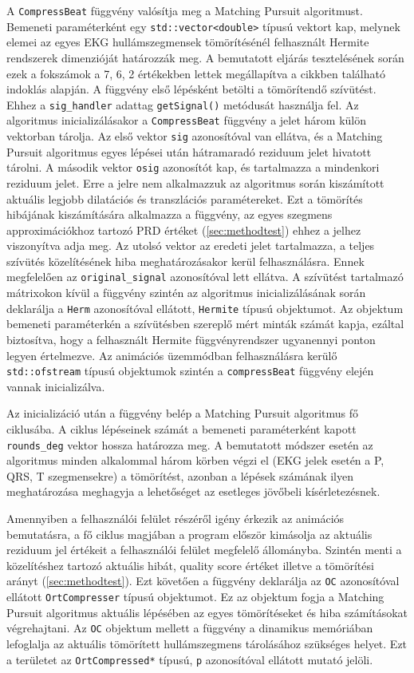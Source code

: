 \documentclass[oneside,titlepage,12pt,a4paper]{report}
\begin{document}
A \texttt{CompressBeat} függvény valósítja meg a Matching Pursuit algoritmust. Bemeneti paraméterként egy \texttt{std::vector<double>}
típusú vektort kap, melynek elemei az egyes EKG hullámszegmensek tömörítésénél felhasznált Hermite rendszerek dimenzióját határozzák meg. 
A bemutatott eljárás tesztelésének során ezek a fokszámok a 7, 6, 2 értékekben lettek megállapítva a \cite{origCikk} cikkben 
található indoklás alapján. A függvény első lépésként betölti a tömörítendő szívütést. Ehhez a \texttt{sig\_handler} 
adattag \texttt{getSignal()} metódusát használja fel. Az algoritmus inicializálásakor a \texttt{CompressBeat} függvény a jelet három külön vektorban tárolja.
Az első vektor \texttt{sig} azonosítóval van ellátva, és a Matching Pursuit algoritmus egyes lépései után hátramaradó reziduum jelet hivatott tárolni.
A második vektor \texttt{osig} azonosítót kap, és tartalmazza a mindenkori reziduum jelet. Erre a jelre nem alkalmazzuk az algoritmus során kiszámított aktuális legjobb dilatációs és transzlációs paramétereket. Ezt a tömörítés hibájának kiszámítására alkalmazza a függvény, az egyes szegmens approximációkhoz tartozó PRD értéket (\ref{sec:methodtest}) ehhez a jelhez
viszonyítva adja meg.  Az utolsó vektor az eredeti jelet tartalmazza, a teljes szívütés közelítésének hiba meghatározásakor kerül felhasználásra. Ennek megfelelően az \texttt{original\_signal} azonosítóval lett ellátva. A szívütést tartalmazó mátrixokon kívül a függvény szintén az algoritmus inicializálásának során deklarálja a \texttt{Herm} azonosítóval ellátott, \texttt{Hermite} típusú objektumot. Az objektum bemeneti paraméterkén a szívütésben szereplő mért minták számát kapja, ezáltal biztosítva, hogy a felhasznált Hermite függvényrendszer ugyanennyi ponton legyen értelmezve. Az animációs üzemmódban felhasználásra kerülő \texttt{std::ofstream} típusú objektumok szintén a \texttt{compressBeat} függvény elején vannak inicializálva. 
\par Az inicializáció után a függvény belép a Matching Pursuit algoritmus fő ciklusába. A ciklus lépéseinek számát a bemeneti paraméterként kapott \texttt{rounds\_deg} vektor hossza határozza meg. A bemutatott módszer esetén az algoritmus minden alkalommal három körben végzi el (EKG jelek esetén a P, QRS, T szegmensekre) a tömörítést, azonban a lépések számának ilyen meghatározása meghagyja a lehetőséget az esetleges jövőbeli kísérletezésnek. 
\par Amennyiben a felhasználói felület részéről igény érkezik az animációs bemutatásra, a fő ciklus magjában a program  először kimásolja az aktuális reziduum jel értékeit a felhasználói felület megfelelő állományba. Szintén menti a közelítéshez tartozó aktuális hibát, quality score értéket illetve a tömörítési arányt (\ref{sec:methodtest}). Ezt követően a függvény deklarálja az \texttt{OC} azonosítóval ellátott \texttt{OrtCompresser} típusú objektumot. Ez az objektum fogja a Matching Pursuit algoritmus aktuális lépésében az egyes tömörítéseket és hiba számításokat végrehajtani. Az \texttt{OC} objektum mellett a függvény a dinamikus memóriában lefoglalja az aktuális tömörített hullámszegmens tárolásához szükséges helyet. Ezt a területet az \texttt{OrtCompressed*} típusú, \texttt{p} azonosítóval ellátott mutató jelöli. 
\end{document}
